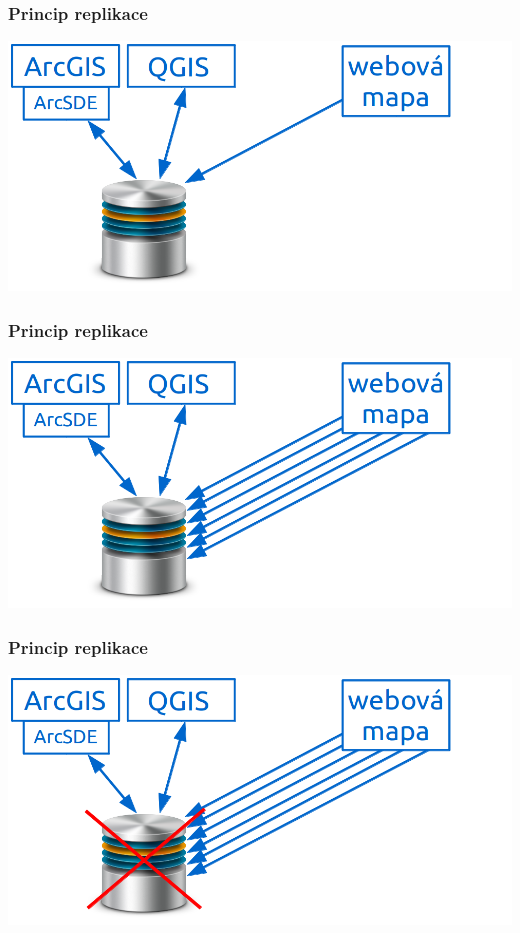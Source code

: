 \documentclass[xcolor=dvipsnames, 14pt]{beamer}
\begin{document}
  \begin{frame}
    \frametitle{Princip replikace}
    \centering
    \includegraphics[scale=0.45]{obr/schema2.png} 
  \end{frame}

  \begin{frame}
    \frametitle{Princip replikace}
    \centering
    \includegraphics[scale=0.45]{obr/schema3.png} 
  \end{frame}

  \begin{frame}
    \frametitle{Princip replikace}
    \centering
    \includegraphics[scale=0.45]{obr/schema4.png} 
  \end{frame}
\end{document}
